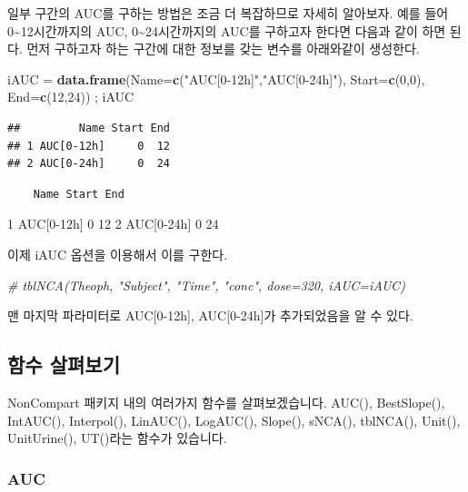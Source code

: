 \documentclass[]{krantz}
\makeatletter
\newenvironment{Shaded}{\begin{snugshade}}{\end{snugshade}}
\newcommand{\KeywordTok}[1]{\textcolor[rgb]{0.13,0.29,0.53}{\textbf{#1}}}
\newcommand{\DataTypeTok}[1]{\textcolor[rgb]{0.13,0.29,0.53}{#1}}
\newcommand{\DecValTok}[1]{\textcolor[rgb]{0.00,0.00,0.81}{#1}}
\newcommand{\StringTok}[1]{\textcolor[rgb]{0.31,0.60,0.02}{#1}}
\newcommand{\CommentTok}[1]{\textcolor[rgb]{0.56,0.35,0.01}{\textit{#1}}}
\newcommand{\NormalTok}[1]{#1}
\newenvironment{kframe}{%
\medskip{}
\setlength{\fboxsep}{.8em}
 \def\at@end@of@kframe{}%
 \ifinner\ifhmode%
  \def\at@end@of@kframe{\end{minipage}}%
  \begin{minipage}{\columnwidth}%
 \fi\fi%
 \def\FrameCommand##1{\hskip\@totalleftmargin \hskip-\fboxsep
 \colorbox{shadecolor}{##1}\hskip-\fboxsep
     \hskip-\linewidth \hskip-\@totalleftmargin \hskip\columnwidth}%
 \MakeFramed {\advance\hsize-\width
   \@totalleftmargin\z@ \linewidth\hsize
   \@setminipage}}%
 {\par\unskip\endMakeFramed%
 \at@end@of@kframe}
\renewenvironment{Shaded}{\begin{kframe}}{\end{kframe}}
\theoremstyle{definition}
\theoremstyle{definition}
\theoremstyle{definition}
\theoremstyle{remark}
\makeatother
\begin{document}
일부 구간의 AUC를 구하는 방법은 조금 더 복잡하므로 자세히 알아보자. 예를
들어 0\textasciitilde{}12시간까지의 AUC, 0\textasciitilde{}24시간까지의
AUC를 구하고자 한다면 다음과 같이 하면 된다. 먼저 구하고자 하는 구간에
대한 정보를 갖는 변수를 아래와같이 생성한다.

\begin{Shaded}
\begin{Highlighting}[]
\NormalTok{iAUC =}\StringTok{ }\KeywordTok{data.frame}\NormalTok{(}\DataTypeTok{Name=}\KeywordTok{c}\NormalTok{(}\StringTok{"AUC[0-12h]"}\NormalTok{,}\StringTok{"AUC[0-24h]"}\NormalTok{), }\DataTypeTok{Start=}\KeywordTok{c}\NormalTok{(}\DecValTok{0}\NormalTok{,}\DecValTok{0}\NormalTok{), }\DataTypeTok{End=}\KeywordTok{c}\NormalTok{(}\DecValTok{12}\NormalTok{,}\DecValTok{24}\NormalTok{)) ; iAUC}
\end{Highlighting}
\end{Shaded}

\begin{verbatim}
##         Name Start End
## 1 AUC[0-12h]     0  12
## 2 AUC[0-24h]     0  24
\end{verbatim}

\begin{verbatim}
    Name Start End
\end{verbatim}

1 AUC{[}0-12h{]} 0 12 2 AUC{[}0-24h{]} 0 24

이제 iAUC 옵션을 이용해서 이를 구한다.

\begin{Shaded}
\begin{Highlighting}[]
\CommentTok{# tblNCA(Theoph, "Subject", "Time", "conc", dose=320, iAUC=iAUC)}
\end{Highlighting}
\end{Shaded}

맨 마지막 파라미터로 AUC{[}0-12h{]}, AUC{[}0-24h{]}가 추가되었음을 알 수
있다.

\subsection{함수 살펴보기}\label{-}

NonCompart 패키지 내의 여러가지 함수를 살펴보겠습니다. AUC(),
BestSlope(), IntAUC(), Interpol(), LinAUC(), LogAUC(), Slope(), sNCA(),
tblNCA(), Unit(), UnitUrine(), UT()라는 함수가 있습니다.

\subsubsection{AUC}\label{auc}
\end{document}
